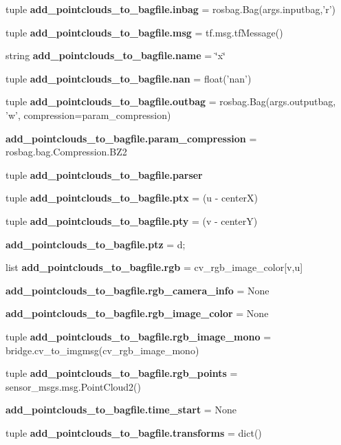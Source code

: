 \begin{DoxyCompactItemize}
tuple {\bf add\-\_\-pointclouds\-\_\-to\-\_\-bagfile.\-inbag} = rosbag.\-Bag(args.\-inputbag,'r')
\item 
tuple {\bf add\-\_\-pointclouds\-\_\-to\-\_\-bagfile.\-msg} = tf.\-msg.\-tf\-Message()
\item 
string {\bf add\-\_\-pointclouds\-\_\-to\-\_\-bagfile.\-name} = \char`\"{}x\char`\"{}
\item 
tuple {\bf add\-\_\-pointclouds\-\_\-to\-\_\-bagfile.\-nan} = float('nan')
\item 
tuple {\bf add\-\_\-pointclouds\-\_\-to\-\_\-bagfile.\-outbag} = rosbag.\-Bag(args.\-outputbag, 'w', compression=param\-\_\-compression)
\item 
{\bf add\-\_\-pointclouds\-\_\-to\-\_\-bagfile.\-param\-\_\-compression} = rosbag.\-bag.\-Compression.\-B\-Z2
\item 
tuple {\bf add\-\_\-pointclouds\-\_\-to\-\_\-bagfile.\-parser}
\item 
tuple {\bf add\-\_\-pointclouds\-\_\-to\-\_\-bagfile.\-ptx} = (u -\/ center\-X)
\item 
tuple {\bf add\-\_\-pointclouds\-\_\-to\-\_\-bagfile.\-pty} = (v -\/ center\-Y)
\item 
{\bf add\-\_\-pointclouds\-\_\-to\-\_\-bagfile.\-ptz} = d;
\item 
list {\bf add\-\_\-pointclouds\-\_\-to\-\_\-bagfile.\-rgb} = cv\-\_\-rgb\-\_\-image\-\_\-color[v,u]
\item 
{\bf add\-\_\-pointclouds\-\_\-to\-\_\-bagfile.\-rgb\-\_\-camera\-\_\-info} = \-None
\item 
{\bf add\-\_\-pointclouds\-\_\-to\-\_\-bagfile.\-rgb\-\_\-image\-\_\-color} = \-None
\item 
tuple {\bf add\-\_\-pointclouds\-\_\-to\-\_\-bagfile.\-rgb\-\_\-image\-\_\-mono} = bridge.\-cv\-\_\-to\-\_\-imgmsg(cv\-\_\-rgb\-\_\-image\-\_\-mono)
\item 
tuple {\bf add\-\_\-pointclouds\-\_\-to\-\_\-bagfile.\-rgb\-\_\-points} = sensor\-\_\-msgs.\-msg.\-Point\-Cloud2()
\item 
{\bf add\-\_\-pointclouds\-\_\-to\-\_\-bagfile.\-time\-\_\-start} = \-None
\item 
tuple {\bf add\-\_\-pointclouds\-\_\-to\-\_\-bagfile.\-transforms} = dict()
\end{DoxyCompactItemize}
